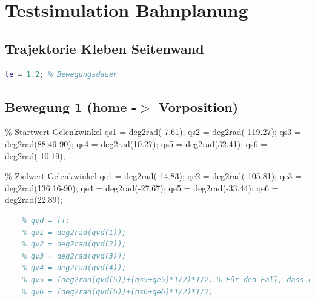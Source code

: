 \section{Testsimulation Bahnplanung}
\label{add:sim}
%
\subsection{Trajektorie Kleben Seitenwand}
%
\begin{lstlisting}[language=Matlab, numbers=none]
	te = 1.2; % Bewegungsdauer
\end{lstlisting}
%
\subsection{Bewegung 1 (home -\ensuremath{>} Vorposition)}
%
\begin{par}
	\% Startwert Gelenkwinkel qs1 = deg2rad(-7.61); qs2 = deg2rad(-119.27); qs3 = deg2rad(88.49-90); qs4 = deg2rad(10.27); qs5 = deg2rad(32.41); qs6 = deg2rad(-10.19);
\end{par} \vspace{1em}
\begin{par}
	\% Zielwert Gelenkwinkel qe1 = deg2rad(-14.83); qe2 = deg2rad(-105.81); qe3 = deg2rad(136.16-90); qe4 = deg2rad(-27.67); qe5 = deg2rad(-33.44); qe6 = deg2rad(22.89);
\end{par} \vspace{1em}
\begin{lstlisting}[language=Matlab, numbers=none]
	% optimierte Via-Punkte
	% qvd = [];
	% qv1 = deg2rad(qvd(1));
	% qv2 = deg2rad(qvd(2));
	% qv3 = deg2rad(qvd(3));
	% qv4 = deg2rad(qvd(4));
	% qv5 = (deg2rad(qvd(5))+(qs5+qe5)*1/2)*1/2; % Für den Fall, dass der Wert zu dicht an den Grenzen liegt, was eine hohe Beschleunigung zur Folge hat, wird das Mittel aus dem optimierten und dem initialen Via-Punkt gebildet
	% qv6 = (deg2rad(qvd(6))+(qs6+qe6)*1/2)*1/2;
\end{lstlisting}
%
